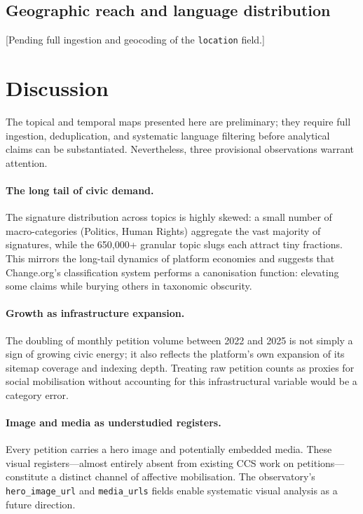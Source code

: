\documentclass[a4paper, justified, notoc, nobib]{tufte-handout}
\begin{document}
\subsection{Geographic reach and language distribution}
[Pending full ingestion and geocoding of the \texttt{location} field.]

\section{Discussion}

The topical and temporal maps presented here are preliminary; they require
full ingestion, deduplication, and systematic language filtering before
analytical claims can be substantiated.
Nevertheless, three provisional observations warrant attention.

\paragraph{The long tail of civic demand.}
The signature distribution across topics is highly skewed: a small number of
macro-categories (Politics, Human Rights) aggregate the vast majority of
signatures, while the 650,000+ granular topic slugs each attract tiny
fractions.
This mirrors the long-tail dynamics of platform economies and suggests that
Change.org's classification system performs a canonisation function: elevating
some claims while burying others in taxonomic obscurity.

\paragraph{Growth as infrastructure expansion.}
The doubling of monthly petition volume between 2022 and 2025 is not simply
a sign of growing civic energy; it also reflects the platform's own expansion
of its sitemap coverage and indexing depth.
Treating raw petition counts as proxies for social mobilisation without
accounting for this infrastructural variable would be a category error.

\paragraph{Image and media as understudied registers.}
Every petition carries a hero image and potentially embedded media.
These visual registers---almost entirely absent from existing CCS work on
petitions---constitute a distinct channel of affective mobilisation.
The observatory's \texttt{hero\_image\_url} and \texttt{media\_urls} fields
enable systematic visual analysis as a future direction.
\end{document}
